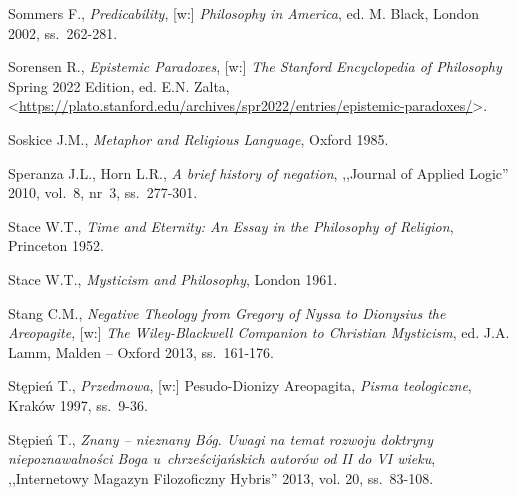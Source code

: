 \begin{thebibliography}{100}
Sommers F., \textit{Predicability}, [w:] \textit{Philosophy in America}, ed. M. Black, London 2002, ss.~262-281.


Sorensen R., \textit{Epistemic Paradoxes}, [w:] \textit{The Stanford Encyclopedia of Philosophy}
Spring 2022 Edition, ed. E.N. Zalta, <\url{https://plato.stanford.edu/archives/spr2022/entries/epistemic-paradoxes/}>.

Soskice J.M., \textit{Metaphor and Religious Language}, Oxford 1985.

Speranza J.L., Horn L.R., \textit{A brief history of negation}, ,,Journal of Applied Logic'' 2010, vol.~8, nr~3, ss.~277-301.


Stace W.T., \textit{Time and Eternity: An Essay in the Philosophy of Religion}, Princeton 1952.

Stace W.T., \textit{Mysticism and Philosophy}, London 1961.

Stang C.M., \textit{Negative Theology from Gregory of Nyssa to Dionysius the Areopagite}, [w:] \textit{The Wiley-Blackwell Companion to Christian Mysticism},
ed. J.A. Lamm, Malden -- Oxford 2013, ss.~161-176.



Stępień T., \textit{Przedmowa}, [w:] Pesudo-Dionizy Areopagita, \textit{Pisma teologiczne}, Kraków 1997,  ss.~9-36.

Stępień T., \textit{Znany -- nieznany Bóg. Uwagi na temat rozwoju doktryny niepoznawalności Boga u~chrześcijańskich autorów od II do VI wieku}, ,,Internetowy Magazyn Filozoficzny Hybris'' 2013, vol. 20, ss.~83-108.


\end{thebibliography}
